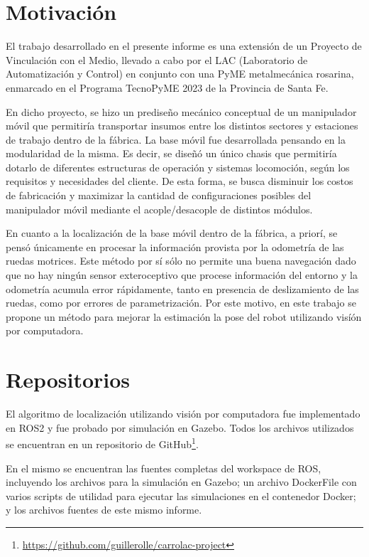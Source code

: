\documentclass[12pt, a4paper]{report}
\begin{document}
		\section{Motivación}\label{sec:motivacion}
			El trabajo desarrollado en el presente informe es una extensión de un Proyecto de Vinculación con el Medio, llevado a cabo por el LAC (Laboratorio de Automatización y Control) en conjunto con una PyME metalmecánica rosarina, enmarcado en el Programa TecnoPyME 2023 de la Provincia de Santa Fe.

			En dicho proyecto, se hizo un prediseño mecánico conceptual de un manipulador móvil que permitiría transportar insumos entre los distintos sectores y estaciones de trabajo dentro de la fábrica.
			La base móvil fue desarrollada pensando en la modularidad de la misma.
			Es decir, se diseñó un único chasis que permitiría dotarlo de diferentes estructuras de operación y sistemas locomoción, según los requisitos y necesidades del cliente.
			De esta forma, se busca disminuir los costos de fabricación y maximizar la cantidad de configuraciones posibles del manipulador móvil mediante el acople/desacople de distintos módulos.

			En cuanto a la localización de la base móvil dentro de la fábrica, a priorí, se pensó únicamente en procesar la información provista por la odometría de las ruedas motrices.
			Este método por sí sólo no permite una buena navegación dado que no hay ningún sensor exteroceptivo que procese información del entorno y la odometría acumula error rápidamente, tanto en presencia de deslizamiento de las ruedas, como por errores de parametrización.
			Por este motivo, en este trabajo se propone un método para mejorar la estimación la pose del robot utilizando visíón por computadora.

		\section{Repositorios}\label{sec:repositorios}
	El algoritmo de localización utilizando visión por computadora fue implementado en ROS2 y fue probado por simulación en Gazebo.
			Todos los archivos utilizados se encuentran en un repositorio de GitHub\footnote{\url{https://github.com/guillerolle/carrolac-project}}.

			En el mismo se encuentran las fuentes completas del workspace de ROS, incluyendo los archivos para la simulación en Gazebo; un archivo DockerFile con varios scripts de utilidad para ejecutar las simulaciones en el contenedor Docker; y los archivos fuentes de este mismo informe.
\end{document}
